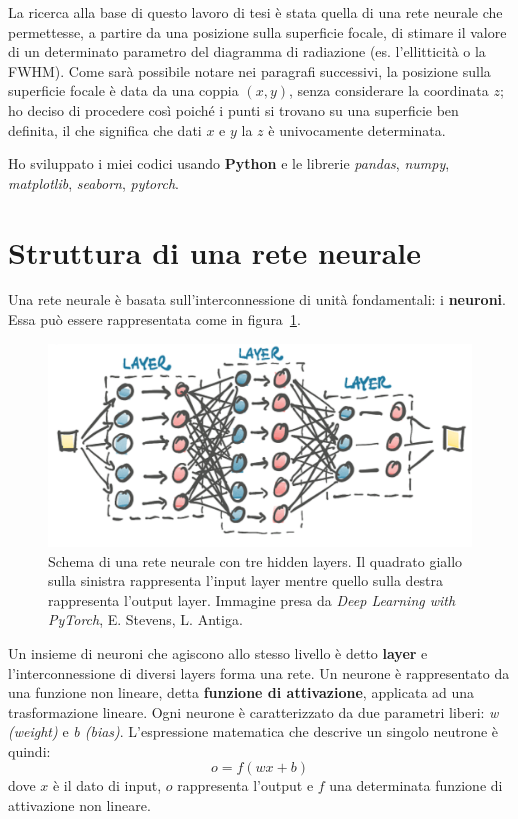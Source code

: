 \documentclass[12pt,a4paper,final]{book}
\begin{document}
La ricerca alla base di questo lavoro di tesi è stata quella di una rete neurale che permettesse, a partire da una posizione sulla superficie focale, di stimare il valore di un determinato parametro del diagramma di radiazione (es. l'ellitticità o la FWHM). Come sarà possibile notare nei paragrafi successivi, la posizione sulla superficie focale è data da una coppia $(x, y)$, senza considerare la coordinata $z$; ho deciso di procedere così poiché i punti si trovano su una superficie ben definita, il che significa che dati $x$ e $y$ la $z$ è univocamente determinata.


Ho sviluppato i miei codici usando \textbf{Python} e le librerie \textit{pandas}, \textit{numpy}, \textit{matplotlib}, \textit{seaborn}, \textit{pytorch}.


\section{Struttura di una rete neurale}\label{struttura_rete}
Una rete neurale è basata sull'interconnessione di unità fondamentali: i \textbf{neuroni}.
Essa può essere rappresentata come in figura~\ref{schema_rete}.
\begin{figure}[!ht]
	\centering
	\includegraphics[width=0.6\linewidth]{../figures/schema_rete.png}
	\caption{Schema di una rete neurale con tre hidden layers. Il quadrato giallo sulla sinistra rappresenta l'input layer mentre quello sulla destra rappresenta l'output layer. Immagine presa da \textit{Deep Learning with PyTorch}, E. Stevens, L. Antiga\cite{stevens}.}
	\label{schema_rete}
\end{figure}
Un insieme di neuroni che agiscono allo stesso livello è detto \textbf{layer} e l'interconnessione di diversi layers forma una rete.
Un neurone è rappresentato da una funzione non lineare, detta \textbf{funzione di attivazione}, applicata ad una trasformazione lineare. Ogni neurone è caratterizzato da due parametri liberi: \textit{w (weight)} e \textit{b (bias)}. L'espressione matematica che descrive un singolo neutrone è quindi:
\[o=f(wx+b)\]
 dove $x$ è il dato di input, $o$ rappresenta l'output e $f$ una determinata funzione di attivazione non lineare.
\end{document}
